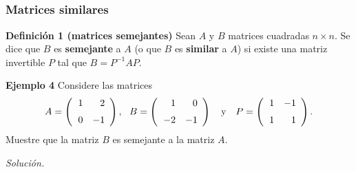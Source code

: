 
\subsection{}
%
\begin{frame}\frametitle{Matrices similares}
	
	\begin{block}{\textbf{Definición 1 (matrices semejantes)}}
		\justifying
		Sean $A$ y $B$ matrices cuadradas $n\times n$. Se dice que $B$ es \textbf{semejante } a $A$ (o que $B$ es \textbf{similar} a $A$) si existe una matriz invertible $P$ tal que $B=P^{-1}AP$.
	\end{block}
	
	
	\begin{ej}{\textbf{Ejemplo 4}}
		\justifying
		Considere las matrices
		\[
		A = 
		\left( 
		\begin{array}{@{\hspace{1\tabcolsep}}rr}	
		1 & 2 \\[2mm] 
		0 & -1
		\end{array} 
		\right),\ \
		B = 
		\left( 
		\begin{array}{@{\hspace{1\tabcolsep}}rr}	
		1 & 0 \\[2mm] 
		-2 & -1		
		\end{array} 
		\right)
		\quad \text{y} \quad
		P = 
		\left( 
		\begin{array}{@{\hspace{1\tabcolsep}}rr}	
		1 & -1 \\[2mm] 
		1 & 1		
		\end{array} 
		\right).
		\]
		Muestre que la matriz $B$ es semejante a la matriz $A$.
	\end{ej}

	\textit{Solución.}
	
\end{frame}


